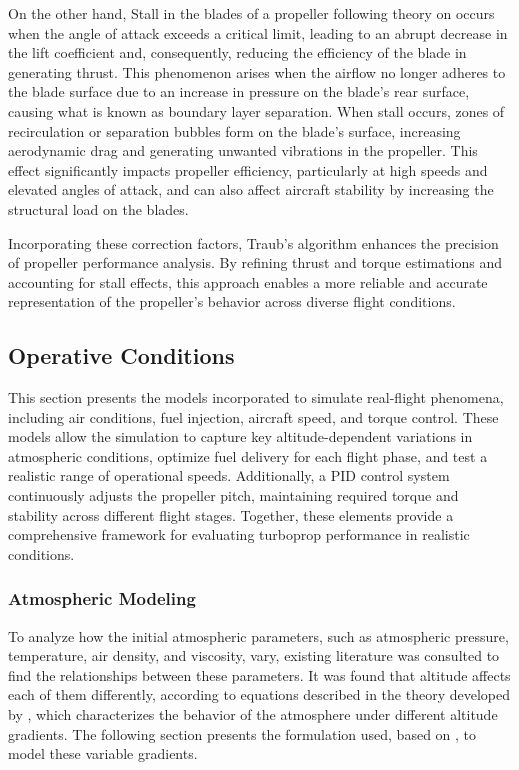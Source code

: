 \documentclass{Format}
\begin{document}
On the other hand, Stall in the blades of a propeller following theory on \cite{burton2011wind} occurs when the angle of attack exceeds a critical limit, leading to an abrupt decrease in the lift coefficient and, consequently, reducing the efficiency of the blade in generating thrust. This phenomenon arises when the airflow no longer adheres to the blade surface due to an increase in pressure on the blade’s rear surface, causing what is known as boundary layer separation. When stall occurs, zones of recirculation or separation bubbles form on the blade’s surface, increasing aerodynamic drag and generating unwanted vibrations in the propeller. This effect significantly impacts propeller efficiency, particularly at high speeds and elevated angles of attack, and can also affect aircraft stability by increasing the structural load on the blades.

Incorporating these correction factors, Traub’s algorithm enhances the precision of propeller performance analysis. By refining thrust and torque estimations and accounting for stall effects, this approach enables a more reliable and accurate representation of the propeller’s behavior across diverse flight conditions.

\subsection{Operative Conditions}
This section presents the models incorporated to simulate real-flight phenomena, including air conditions, fuel injection, aircraft speed, and torque control. These models allow the simulation to capture key altitude-dependent variations in atmospheric conditions, optimize fuel delivery for each flight phase, and test a realistic range of operational speeds. Additionally, a PID control system continuously adjusts the propeller pitch, maintaining required torque and stability across different flight stages. Together, these elements provide a comprehensive framework for evaluating turboprop performance in realistic conditions.


\subsubsection{Atmospheric Modeling}
    To analyze how the initial atmospheric parameters, such as atmospheric pressure, temperature, air density, and viscosity, vary, existing literature was consulted to find the relationships between these parameters. It was found that altitude affects each of them differently, according to equations described in the theory developed by \cite{us_standard_atmosphere_1976}, which characterizes the behavior of the atmosphere under different altitude gradients. The following section presents the formulation used, based on \cite{us_standard_atmosphere_1976}, to model these variable gradients. 
    
\end{document}
